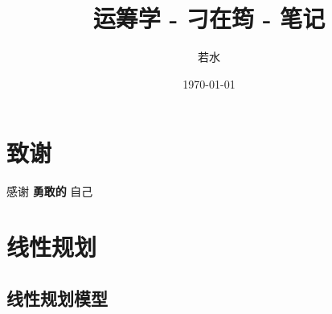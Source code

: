 \documentclass[lang = cn, scheme = chinese, thmcnt = section]{elegantbook}
\title{运筹学 - 刁在筠 - 笔记}                %
\author{若水}                        %
\date{\today}                       %
\begin{document}
	
	\maketitle       %
	
	\frontmatter     %
	
	\chapter*{致谢}
	
	
	\vspace*{\fill}
	\begin{center}
		
		\large{感谢 \textbf{ 勇敢的 } 自己}
		
	\end{center}
	\vspace*{\fill}
	
	\tableofcontents %
	
	\mainmatter      %

\chapter{线性规划}

\section{线性规划模型}
\end{document}
